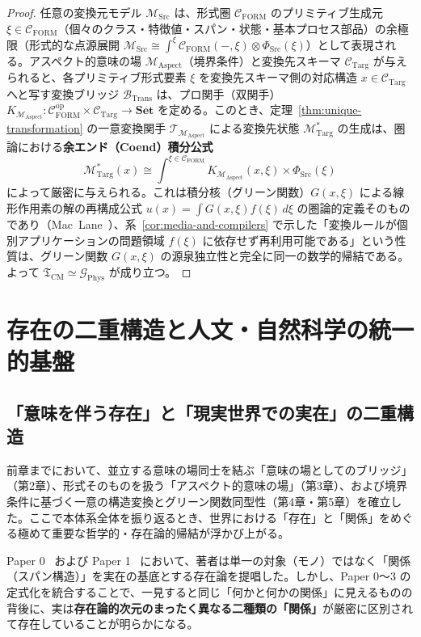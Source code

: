 \documentclass[11pt,a4paper]{ltjsarticle}
\theoremstyle{definition}
\theoremstyle{plain}
\theoremstyle{remark}
\newcommand{\Set}{\mathbf{Set}}
\newcommand{\CFORM}{\mathcal{C}_{\mathrm{FORM}}}
\newcommand{\CTarg}{\mathcal{C}_{\mathrm{Targ}}}
\newcommand{\MSrc}{\mathcal{M}_{\mathrm{Src}}}
\newcommand{\MTarg}{\mathcal{M}_{\mathrm{Targ}}}
\newcommand{\MAspect}{\mathcal{M}_{\mathrm{Aspect}}}
\newcommand{\BTrans}{\mathcal{B}_{\mathrm{Trans}}}
\begin{document}
\begin{proof}
任意の変換元モデル $\MSrc$ は、形式圏 $\CFORM$ のプリミティブ生成元 $\xi \in \CFORM$（個々のクラス・特徴値・スパン・状態・基本プロセス部品）の余極限（形式的な点源展開 $\MSrc \cong \int^{\xi} \CFORM(-, \xi) \otimes \Phi_{\mathrm{Src}}(\xi)$）として表現される。アスペクト的意味の場 $\MAspect$（境界条件）と変換先スキーマ $\CTarg$ が与えられると、各プリミティブ形式要素 $\xi$ を変換先スキーマ側の対応構造 $x \in \CTarg$ へと写す変換ブリッジ $\BTrans$ は、プロ関手（双関手）$K_{\MAspect} : \CFORM^{\mathrm{op}} \times \CTarg \to \Set$ を定める。このとき、定理~\ref{thm:unique-transformation} の一意変換関手 $\mathcal{T}_{\MAspect}$ による変換先状態 $\MTarg^*$ の生成は、圏論における\textbf{余エンド（Coend）積分公式}
\begin{equation}
\MTarg^*(x) \cong \int^{\xi \in \CFORM} K_{\MAspect}(x, \xi) \times \Phi_{\mathrm{Src}}(\xi)
\end{equation}
によって厳密に与えられる。これは積分核（グリーン関数）$G(x, \xi)$ による線形作用素の解の再構成公式 $u(x) = \int G(x, \xi) f(\xi)\, d\xi$ の圏論的定義そのものであり（Mac~Lane~\cite{maclane1998}）、系~\ref{cor:media-and-compilers} で示した「変換ルールが個別アプリケーションの問題領域 $f(\xi)$ に依存せず再利用可能である」という性質は、グリーン関数 $G(x, \xi)$ の源泉独立性と完全に同一の数学的帰結である。よって $\mathfrak{T}_{\mathrm{CM}} \simeq \mathcal{G}_{\mathrm{Phys}}$ が成り立つ。
\end{proof}

\section{存在の二重構造と人文・自然科学の統一的基盤}

\subsection{「意味を伴う存在」と「現実世界での実在」の二重構造}
前章までにおいて、並立する意味の場同士を結ぶ「意味の場としてのブリッジ」（第2章）、形式そのものを扱う「アスペクト的意味の場」（第3章）、および境界条件に基づく一意の構造変換とグリーン関数同型性（第4章・第5章）を確立した。ここで本体系全体を振り返るとき、世界における「存在」と「関係」をめぐる極めて重要な哲学的・存在論的帰結が浮かび上がる。

Paper 0~\cite{ota2026paper0} および Paper 1~\cite{ota2026paper1} において、著者は単一の対象（モノ）ではなく「関係（スパン構造）」を実在の基底とする存在論を提唱した。しかし、Paper 0〜3 の定式化を統合することで、一見すると同じ「何かと何かの関係」に見えるものの背後に、実は\textbf{存在論的次元のまったく異なる二種類の「関係」}が厳密に区別されて存在していることが明らかになる。
\end{document}
